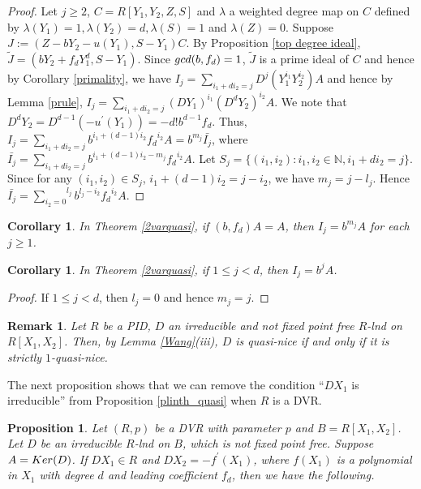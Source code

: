 \documentclass[a4paper,12pt]{article}
\newtheorem{prop}[thm]{Proposition}
\newtheorem{cor}[thm]{Corollary}
\newtheorem{rem}[thm]{Remark}
\newcommand{\bN}{\mathbb N}
\begin{document}
{\begin{proof}
\smallskip\noindent   
Let $j\geqslant 2$, $C=R[Y_1,Y_2,Z,S]$ and $\lambda$ a weighted degree map on $C$ defined by $\lambda(Y_1)=1,\lambda(Y_2)=d,\lambda(S)=1$ and $\lambda(Z)=0$. Suppose $J:=(Z-bY_2-u(Y_1),S-Y_1)C$. By Proposition \ref{top degree ideal}, $\widetilde{J}=(bY_2+f_dY_1^d,S-Y_1)$. Since ${\rm gcd}(b,f_d)=1$, $\widetilde{J}$ is a prime ideal of $C$ and hence by Corollary \ref{primality}, we have 
$I_j=\underset{i_1+di_2=j}\sum D ^j(Y_1^{i_1}Y_2^{i_2}) A$ and hence by Lemma \ref{prule}, $I_j=\underset{i_1+di_2=j}\sum {(DY_1)}^{i_1}{(D^dY_2)}^{i_2}A$. We note that $D^dY_2=D^{d-1}(-u^{\prime}(Y_1))=-d!b^{d-1}f_d$. Thus, $I_j=\underset{i_1+di_2=j}\sum b^{i_1+(d-1)i_2}{f_d}^{i_2}A=b^{m_j}\bar{I_j}$, where $\bar{I_j}=\underset{i_1+di_2=j}\sum b^{i_1+(d-1)i_2-m_j}{f_d}^{i_2}A$. Let $S_j=\{(i_1,i_2):i_1,i_2\in\bN, i_1+di_2=j\}$. Since for any $(i_1,i_2)\in S_j$, $i_1+(d-1)i_2=j-i_2$, we have $m_j=j-l_j$. Hence $\bar{I_j}=\overset{l_j}{\underset{i_2=0}\sum} b^{l_j-i_2}{f_d}^{i_2}A$.
\end{proof}


%	
%	


\begin{cor}


In {\rm Theorem \ref{2varquasi}}, if $ (b,f_d)A=A$, then $I_j=b^{m_j}A$ for each $j\geqslant 1$.

\end{cor}

\begin{cor}
In {\rm Theorem \ref{2varquasi}}, if $1\leqslant j<d$, then $I_j=b^{j}A$.
\end{cor}

\begin{proof}
If $1\leqslant j<d$, then $l_j=0$ and hence $m_j=j$.  
\end{proof}
\begin{rem}
\em{Let $R$ be a PID, $D$ an irreducible and not fixed point free $R$-lnd on $R[X_1,X_2]$. Then, by Lemma \ref{Wang}(iii), $D$ is quasi-nice if and only if it is strictly $1$-quasi-nice.}
\end{rem}


\indent
The next proposition shows that we can remove the condition ``$DX_1$ is irreducible'' from Proposition \ref{plinth_quasi} when $R$ is a DVR.
\begin{prop}\label{plinth_quasi_DVR} Let $(R,p)$ be a {\rm DVR} with parameter $p$ and $B=R[X_1,X_2]$. Let $D$ be an irreducible $R$-lnd on $B$, which is not fixed point free.  Suppose $A={\rm Ker}(D)$. If $DX_1 \in R$ and $DX_2=-f^{\prime}(X_1)$, where $f(X_1)$ is a polynomial in $X_1$ with degree $d$ and leading coefficient $f_d$, then we have the following.


\end{prop}}
\end{document}
